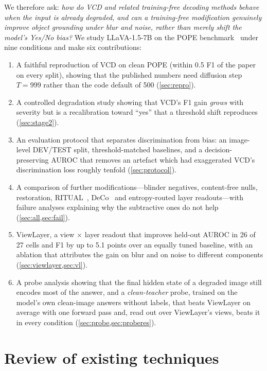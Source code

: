 \documentclass[10pt,a4paper]{article}
\newcommand{\ours}{ViewLayer}
\begin{document}
We therefore ask: \emph{how do VCD and related training-free decoding methods behave when the input is already degraded, and can a training-free modification genuinely improve object grounding under blur and noise, rather than merely shift the model's Yes/No bias?} We study LLaVA-1.5-7B on the POPE benchmark~\citep{li2023pope} under nine conditions and make six contributions:
\begin{enumerate}
\item A faithful reproduction of VCD on clean POPE (within 0.5 F1 of the paper on every split), showing that the published numbers need diffusion step $T{=}999$ rather than the code default of 500 (\cref{sec:repro}).
\item A controlled degradation study showing that VCD's F1 gain \emph{grows} with severity but is a recalibration toward ``yes'' that a threshold shift reproduces (\cref{sec:stage2}).
\item An evaluation protocol that separates discrimination from bias: an image-level DEV/TEST split, threshold-matched baselines, and a decision-preserving AUROC that removes an artefact which had exaggerated VCD's discrimination loss roughly tenfold (\cref{sec:protocol}).
\item A comparison of further modifications---blinder negatives, content-free nulls, restoration, RITUAL~\citep{woo2024ritual}, DeCo~\citep{wang2025deco} and entropy-routed layer readouts---with failure analyses explaining why the subtractive ones do not help (\cref{sec:all,sec:fail}).
\item \ours{}, a view $\times$ layer readout that improves held-out AUROC in 26 of 27 cells and F1 by up to 5.1 points over an equally tuned baseline, with an ablation that attributes the gain on blur and on noise to different components (\cref{sec:viewlayer,sec:vl}).
\item A probe analysis showing that the final hidden state of a degraded image still encodes most of the answer, and a \emph{clean-teacher} probe, trained on the model's own clean-image answers without labels, that beats \ours{} on average with one forward pass and, read out over \ours{}'s views, beats it in every condition (\cref{sec:probe,sec:proberes}).
\end{enumerate}

\section{Review of existing techniques}\label{sec:related}
\end{document}
